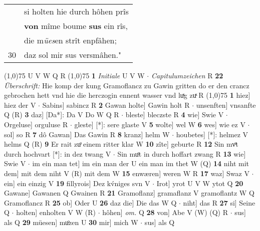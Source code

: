 \documentclass[8pt,a4paper,notitlepage]{article}
\begin{document}
\begin{table}[ht]
\begin{minipage}[t]{0.5\linewidth}
\begin{tabular}{rl}
 & si holten hie durch hôhen prîs\\ 
 & \textbf{von} mîme boume \textbf{sus} ein rîs,\\ 
 & die m\textit{ües}en strît enpfâhen;\\ 
30 & daz sol mir sus versmâhen."\\ 
\end{tabular}
\scriptsize
\line(1,0){75} \newline
U V W Q R \newline
\line(1,0){75} \newline
\textbf{1} \textit{Initiale} U V W   $\cdot$ \textit{Capitulumzeichen} R  \textbf{22} \textit{Überschrift:} Hie komp der kung Gramoflancz zu Gawin gritten do er den crancz gebrochen hett vnd hie die herczogin ennent wasser vnd luͯg zuͯ R  \newline
\line(1,0){75} \newline
\textbf{1} hiez] hiez der V  $\cdot$ Sabins] sabincz R \textbf{2} Gawan holte] Gawin holt R  $\cdot$ unsenften] vnsanfte Q (R) \textbf{3} daz] [Da*]: Da V Do W Q R  $\cdot$ bleste] bleczste R \textbf{4} wie] Swie V  $\cdot$ Orgeluse] orguluse R  $\cdot$ gleste] [*]: sere glaste V \textbf{5} wolte] wel W \textbf{6} wes] wie ez V  $\cdot$ sol] so R \textbf{7} dô Gawan] Das Gawin R \textbf{8} kranz] helm W  $\cdot$ houbetes] [*]: helmez V helms Q (R) \textbf{9} Er rait zuͦ einem ritter klar W \textbf{10} zîte] geburte R \textbf{12} Sin mvͦt durch hochvart [*]: in dez twang V  $\cdot$ Sin muͦt in durch hoffart zwang R \textbf{13} wie] Swie V  $\cdot$ im ein man tet] im ein man der U ein man im thet W (Q) \textbf{14} niht mit dem] mit dem niht V (R) mit dem W \textbf{15} enwæren] weren W R \textbf{17} waz] Swaz V  $\cdot$ ein] ein einzig V \textbf{19} fillyrois] Dez kv́niges svn V  $\cdot$ Irot] yrot U V W ytot Q \textbf{20} Gawane] Gawanen Q Gwainen R \textbf{21} Gramoflanz] gramaflanz V gramoflantz W Q Gramoflancz R \textbf{25} ob] Oder U \textbf{26} daz die] Die das W Q  $\cdot$ niht] das R \textbf{27} si] Seine Q  $\cdot$ holten] enholten V W (R)  $\cdot$ hôhen] \textit{om.} Q \textbf{28} von] Abe V (W) (Q) R  $\cdot$ sus] als Q \textbf{29} müesen] muͦzen U \textbf{30} mir] mich W  $\cdot$ sus] als Q \newline
\end{minipage}
\end{table}
\end{document}
